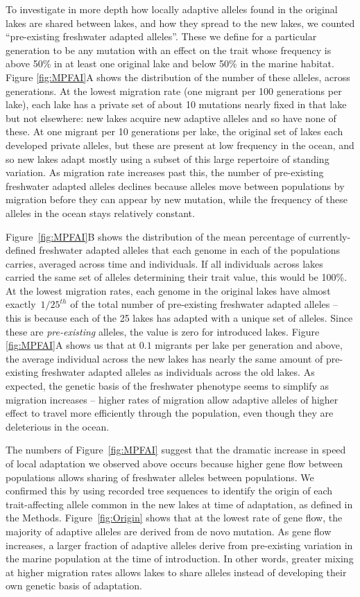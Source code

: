 \documentclass{article}
\begin{document}
To investigate in more depth how locally adaptive alleles found in the original lakes
are shared between lakes, and how they spread to the new lakes,
we counted ``pre-existing freshwater adapted alleles''.
These we define for a particular generation 
to be any mutation with an effect on the trait
whose frequency is above 50\% in at least one original lake 
and below 50\% in the marine habitat.
Figure \ref{fig:MPFAI}A shows the distribution of the number of these alleles, 
across generations.
At the lowest migration rate (one migrant per 100 generations per lake), 
each lake has a private set of about 10 mutations
nearly fixed in that lake but not elsewhere:
new lakes acquire new adaptive alleles and so have none of these.
At one migrant per 10 generations per lake,
the original set of lakes each developed private alleles,
but these are present at low frequency in the ocean,
and so new lakes adapt 
mostly using a subset of this large repertoire of standing variation.
As migration rate increases past this, 
the number of pre-existing freshwater adapted alleles declines
because alleles move between populations by migration
before they can appear by new mutation,
while the frequency of these alleles in the ocean
stays relatively constant.

Figure~\ref{fig:MPFAI}B shows the distribution of 
the mean percentage of currently-defined freshwater adapted alleles 
that each genome in each of the populations carries, 
averaged across time and individuals. 
If all individuals across lakes carried the same set of alleles determining their trait value, 
this would be 100\%. 
At the lowest migration rates,
each genome in the original lakes have almost exactly~$1/25^{th}$ 
of the total number of pre-existing freshwater adapted alleles -- 
this is because each of the 25 lakes has adapted with a unique set of alleles. 
Since these are \emph{pre-existing} alleles, the value is zero for introduced lakes.
Figure \ref{fig:MPFAI}A shows us that at $0.1$ migrants per lake per generation and above,
the average individual across the new lakes has nearly the same amount of 
pre-existing freshwater adapted alleles as individuals across the old lakes.
As expected, the genetic basis of the freshwater phenotype 
seems to simplify as migration increases --
higher rates of migration allow
adaptive alleles of higher effect to travel more efficiently through the population,
even though they are deleterious in the ocean.

The numbers of Figure~\ref{fig:MPFAI} suggest that
the dramatic increase in speed of local adaptation we observed above occurs because
higher gene flow between populations allows sharing of freshwater alleles between populations.
We confirmed this by using recorded tree sequences to identify the origin of each trait-affecting
allele common in the new lakes at time of adaptation,
as defined in the Methods.
Figure~\ref{fig:Origin} shows that at the lowest rate of gene flow,
the majority of adaptive alleles are derived from de novo mutation.
As gene flow increases, a larger fraction of adaptive alleles 
derive from pre-existing variation in the marine population at the time of introduction.
In other words, 
greater mixing at higher migration rates allows lakes to share alleles
instead of developing their own genetic basis of adaptation.
\end{document}
